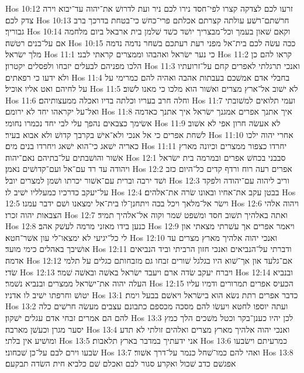 Hos 10:12  זרעו לכם לצדקה קצרו לפי־חסד נירו לכם ניר ועת לדרושׁ את־יהוה עד־יבוא וירה צדק לכם׃
Hos 10:13  חרשׁתם־רשׁע עולתה קצרתם אכלתם פרי־כחשׁ כי־בטחת בדרכך ברב גבוריך׃
Hos 10:14  וקאם שׁאון בעמך וכל־מבצריך יושׁד כשׁד שׁלמן בית ארבאל ביום מלחמה אם על־בנים רטשׁה׃
Hos 10:15  ככה עשׂה לכם בית־אל מפני רעת רעתכם בשׁחר נדמה נדמה מלך ישׂראל׃
Hos 11:1  כי נער ישׂראל ואהבהו וממצרים קראתי לבני׃
Hos 11:2  קראו להם כן הלכו מפניהם לבעלים יזבחו ולפסלים יקטרון׃
Hos 11:3  ואנכי תרגלתי לאפרים קחם על־זרועתיו ולא ידעו כי רפאתים׃
Hos 11:4  בחבלי אדם אמשׁכם בעבתות אהבה ואהיה להם כמרימי על על לחיהם ואט אליו אוכיל׃
Hos 11:5  לא ישׁוב אל־ארץ מצרים ואשׁור הוא מלכו כי מאנו לשׁוב׃
Hos 11:6  וחלה חרב בעריו וכלתה בדיו ואכלה ממעצותיהם׃
Hos 11:7  ועמי תלואים למשׁובתי ואל־על יקראהו יחד לא ירומם׃
Hos 11:8  איך אתנך אפרים אמגנך ישׂראל איך אתנך כאדמה אשׂימך כצבאים נהפך עלי לבי יחד נכמרו נחומי׃
Hos 11:9  לא אעשׂה חרון אפי לא אשׁוב לשׁחת אפרים כי אל אנכי ולא־אישׁ בקרבך קדושׁ ולא אבוא בעיר׃
Hos 11:10  אחרי יהוה ילכו כאריה ישׁאג כי־הוא ישׁאג ויחרדו בנים מים׃
Hos 11:11  יחרדו כצפור ממצרים וכיונה מארץ אשׁור והושׁבתים על־בתיהם נאם־יהוה׃
Hos 12:1  סבבני בכחשׁ אפרים ובמרמה בית ישׂראל ויהודה עד רד עם־אל ועם־קדושׁים נאמן׃
Hos 12:2  אפרים רעה רוח ורדף קדים כל־היום כזב ושׁד ירבה וברית עם־אשׁור יכרתו ושׁמן למצרים יובל׃
Hos 12:3  וריב ליהוה עם־יהודה ולפקד על־יעקב כדרכיו כמעלליו ישׁיב לו׃
Hos 12:4  בבטן עקב את־אחיו ובאונו שׂרה את־אלהים׃
Hos 12:5  וישׂר אל־מלאך ויכל בכה ויתחנן־לו בית־אל ימצאנו ושׁם ידבר עמנו׃
Hos 12:6  ויהוה אלהי הצבאות יהוה זכרו׃
Hos 12:7  ואתה באלהיך תשׁוב חסד ומשׁפט שׁמר וקוה אל־אלהיך תמיד׃
Hos 12:8  כנען בידו מאזני מרמה לעשׁק אהב׃
Hos 12:9  ויאמר אפרים אך עשׁרתי מצאתי און לי כל־יגיעי לא ימצאו־לי עון אשׁר־חטא׃
Hos 12:10  ואנכי יהוה אלהיך מארץ מצרים עד אושׁיבך באהלים כימי מועד׃
Hos 12:11  ודברתי על־הנביאים ואנכי חזון הרביתי וביד הנביאים אדמה׃
Hos 12:12  אם־גלעד און אך־שׁוא היו בגלגל שׁורים זבחו גם מזבחותם כגלים על תלמי שׂדי׃
Hos 12:13  ויברח יעקב שׂדה ארם ויעבד ישׂראל באשׁה ובאשׁה שׁמר׃
Hos 12:14  ובנביא העלה יהוה את־ישׂראל ממצרים ובנביא נשׁמר׃
Hos 12:15  הכעיס אפרים תמרורים ודמיו עליו יטושׁ וחרפתו ישׁיב לו אדניו׃
Hos 13:1  כדבר אפרים רתת נשׂא הוא בישׂראל ויאשׁם בבעל וימת׃
Hos 13:2  ועתה יוספו לחטא ויעשׂו להם מסכה מכספם כתבונם עצבים מעשׂה חרשׁים כלה להם הם אמרים זבחי אדם עגלים ישׁקון׃
Hos 13:3  לכן יהיו כענן־בקר וכטל משׁכים הלך כמץ יסער מגרן וכעשׁן מארבה׃
Hos 13:4  ואנכי יהוה אלהיך מארץ מצרים ואלהים זולתי לא תדע ומושׁיע אין בלתי׃
Hos 13:5  אני ידעתיך במדבר בארץ תלאבות׃
Hos 13:6  כמרעיתם וישׂבעו שׂבעו וירם לבם על־כן שׁכחוני׃
Hos 13:7  ואהי להם כמו־שׁחל כנמר על־דרך אשׁור׃
Hos 13:8  אפגשׁם כדב שׁכול ואקרע סגור לבם ואכלם שׁם כלביא חית השׂדה תבקעם׃
